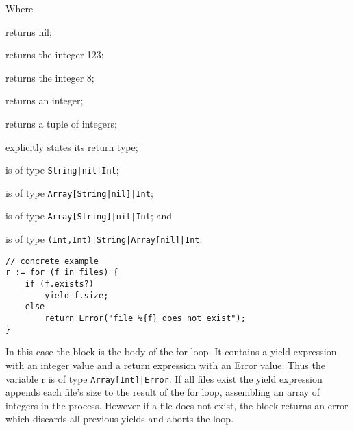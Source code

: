 Where \begin{exdesc}
    \item returns nil;
    \item returns the integer 123;
    \item returns the integer 8;
    \item returns an integer;
    \item returns a tuple of integers;
    \item explicitly states its return type;
    \item is of type \texttt{String|nil|Int};
    \item is of type \texttt{Array[String|nil]|Int};
    \item is of type \texttt{Array[String]|nil|Int}; and
    \item is of type \texttt{(Int,Int)|String|Array[nil]|Int}.
\end{exdesc}

\begin{verbatim}
// concrete example
r := for (f in files) {
    if (f.exists?)
        yield f.size;
    else
        return Error("file %{f} does not exist");
}
\end{verbatim}

In this case the block is the body of the for loop. It contains a yield
expression with an integer value and a return expression with an Error value.
Thus the variable r is of type \texttt{Array[Int]|Error}. If all files exist
the yield expression appends each file's size to the result of the for loop,
assembling an array of integers in the process. However if a file does not
exist, the block returns an error which discards all previous yields and aborts
the loop.
